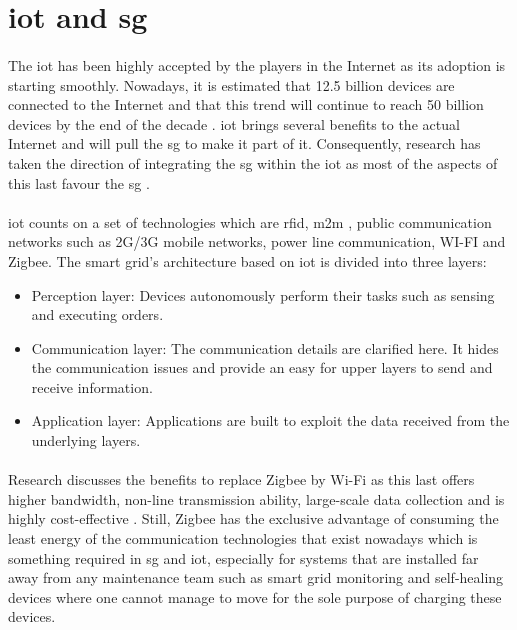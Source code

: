 \documentclass[12pt,a4paper,final]{report}
\begin{document}
\section{\gls{iot} and \gls{sg}}
\paragraph{}
The \gls{iot} has been highly accepted by the players in the Internet as its adoption is starting smoothly. Nowadays, it is estimated that 12.5 billion devices are connected to the Internet and that this trend will continue to reach 50 billion devices by the end of the decade \cite{ref3}. \gls{iot} brings several benefits to the actual Internet and will pull the \gls{sg} to make it part of it. Consequently, research has taken the direction of integrating the \gls{sg} within the \gls{iot} as most of the aspects of this last favour  the \gls{sg} \cite{ref8}.
\paragraph{}
\gls{iot} counts on a set of technologies which are \gls{rfid}, \gls{m2m} \cite{ref9}, public communication networks such as 2G/3G mobile networks, power line communication, WI-FI and Zigbee\cite{ref8}. The smart grid's architecture based on \gls{iot} is divided into three layers:
\begin{itemize}
\item Perception layer: Devices autonomously perform their tasks such as sensing and executing orders.
\item Communication layer: The communication details are clarified here. It hides the communication issues and provide an easy for upper layers to send and receive information.
\item Application layer: Applications are built to exploit the data received from the underlying layers.
\end{itemize}
\paragraph{}
Research discusses the benefits to replace Zigbee by Wi-Fi as this last offers higher bandwidth, non-line transmission ability, large-scale data collection and is highly cost-effective \cite{ref10}. Still, Zigbee has the exclusive advantage of consuming the least energy of the communication technologies that exist nowadays which is something required in \gls{sg} and \gls{iot}, especially for systems that are installed far away from any maintenance team such as smart grid monitoring and self-healing devices where one cannot manage to move for the sole purpose of charging these devices. 
\end{document}
